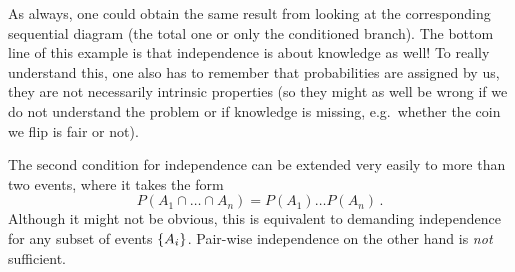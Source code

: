 \begin{ex}
As always, one could obtain the same result from looking at the corresponding sequential diagram (the total one or only the conditioned branch). The bottom line of this example is that independence is about knowledge as well! To really understand this, one also has to remember that probabilities are assigned by us, they are not necessarily intrinsic properties (so they might as well be wrong if we do not understand the problem or if knowledge is missing, e.g.~whether the coin we flip is fair or not).
\end{ex}


The second condition for independence can be extended very easily to more than two events, where it takes the form
\begin{equation}
P(A_1 \cap \dots \cap A_n) = P(A_1) \dots P(A_n) \, .
\end{equation}
Although it might not be obvious, this is equivalent to demanding independence for any subset of events $\qty{A_i}$. Pair-wise independence on the other hand is \emph{not} sufficient.


